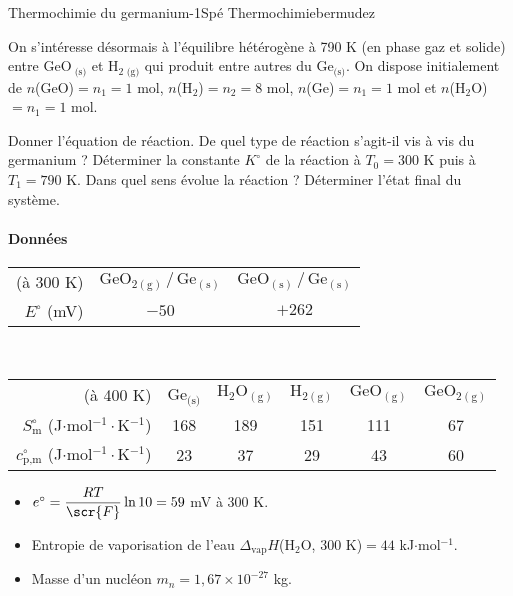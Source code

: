 \begin{exercise}{Thermochimie du germanium}{-1}{Spé}
{Thermochimie}{bermudez}

 On s'intéresse désormais à l'équilibre hétérogène à 790 K (en phase gaz et solide) entre GeO$_{\text{ (s)}}$ et H$_{2\text{ (g)}}$ qui produit entre autres du Ge$_\text{(s)}$.
 On dispose initialement de $n$(GeO)$=n_1=1$ mol, $n$(H$_2$)$=n_2=8$ mol, $n$(Ge)$=n_1=1$ mol et $n$(H$_2$O)$=n_1=1$ mol.
 \begin{questions}
    \question Donner l'équation de réaction. De quel type de réaction s'agit-il vis à vis du germanium ?
    \question Déterminer la constante $K^\circ$ de la réaction à $T_0 = 300$ K puis à $T_1 = 790$ K. 
    \question Dans quel sens évolue la réaction ? Déterminer l'état final du système.
\end{questions}

\paragraph{Données}
\begin{center}
\begin{tabular}{rcc}
    \hline
    (à 300 K) & $\mathrm{GeO_{2 (g)} \,/\, Ge_{(s)}}$ & $\mathrm{GeO_{(s)} \,/\, Ge_{(s)}}$ \\
    $E^\circ$ (mV) & $-50$ & $+262$\\ \hline\hline 
\end{tabular}~\\

\medskip


\begin{tabular}{rccccc}
    \hline
    (à 400 K) & Ge$_\text{(s)}$ & $\mathrm{H_2O_{(g)}}$ & $\mathrm{H_{2 (g)}}$ & $\mathrm{GeO_{(g)}}$ & $\mathrm{GeO_{2 (g)}}$ \\
    $S_\text{m}^\circ$ (J$\cdot$mol$^{-1}\cdot$K$^{-1}$) & 168 & 189 & 151 & 111 & 67  \\
    $c_\text{p,m}^\circ$ (J$\cdot$mol$^{-1}\cdot$K$^{-1}$) & 23 & 37 & 29 & 43 & 60\\ \hline\hline 
\end{tabular}\end{center}
\begin{itemize}
    \item $e^\circ = \dfrac{RT}{\scr{F}} \ln10 = 59$ mV à 300 K.
    \item Entropie de vaporisation de l'eau $\Delta_\text{vap}H$(H$_2$O, 300 K)$ = 44$ kJ$\cdot$mol$^{-1}$.
    \item Masse d'un nucléon $m_n = 1,67\times 10^{-27}$ kg.
\end{itemize}

\end{exercise}
